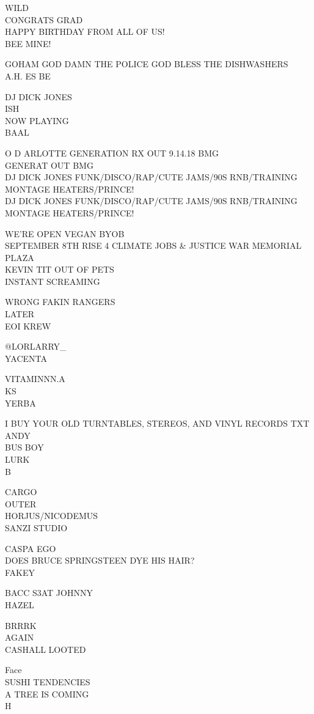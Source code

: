 \documentclass[10pt,letterpaper]{article}
\begin{document}
WILD\\
CONGRATS GRAD\\
HAPPY BIRTHDAY FROM ALL OF US!\\
BEE MINE!

GOHAM GOD DAMN THE POLICE GOD BLESS THE DISHWASHERS\\
A.H. ES BE

DJ DICK JONES\\
ISH\\
NOW PLAYING\\
BAAL

O D ARLOTTE GENERATION RX OUT 9.14.18 BMG\\
GENERAT OUT BMG\\
DJ DICK JONES FUNK/DISCO/RAP/CUTE JAMS/90S RNB/TRAINING MONTAGE HEATERS/PRINCE!\\
DJ DICK JONES FUNK/DISCO/RAP/CUTE JAMS/90S RNB/TRAINING MONTAGE HEATERS/PRINCE!

WE'RE OPEN VEGAN BYOB\\
SEPTEMBER 8TH RISE 4 CLIMATE JOBS \& JUSTICE WAR MEMORIAL PLAZA\\
KEVIN TIT OUT OF PETS\\
INSTANT SCREAMING

WRONG FAKIN RANGERS\\
LATER\\
EOI KREW

@LORLARRY\_\\
YACENTA

VITAMINNN.A\\
KS\\
YERBA

I BUY YOUR OLD TURNTABLES, STEREOS, AND VINYL RECORDS TXT ANDY\\
BUS BOY\\
LURK\\
B

CARGO\\
OUTER\\
HORJUS/NICODEMUS\\
SANZI STUDIO

CASPA EGO\\
DOES BRUCE SPRINGSTEEN DYE HIS HAIR?\\
FAKEY

BACC S3AT JOHNNY\\
HAZEL

BRRRK\\
AGAIN\\
CASHALL LOOTED

Face\\
SUSHI TENDENCIES\\
A TREE IS COMING\\
H
\end{document}
